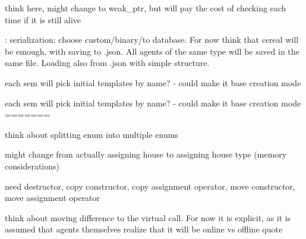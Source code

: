 \begin{DoxyRefList}
\item[\label{_dev_stage2__DevStage2000030}%
\hypertarget{_dev_stage2__DevStage2000030}{}%
Member \hyperlink{classsolar__core_1_1_w_a1d35d6501eef6d673bd2b28e2c1724c4}{solar\+\_\+core\+:\+:W\+:\+:interconnected\+\_\+projects} ]think here, might change to weak\+\_\+ptr, but will pay the cost of checking each time if it is still alive  
\item[\label{_dev_stage2__DevStage2000029}%
\hypertarget{_dev_stage2__DevStage2000029}{}%
Member \hyperlink{classsolar__core_1_1_w_a969ad4de57020878a91873868c9bdb45}{solar\+\_\+core\+:\+:W\+:\+:W} (std\+::string path\+\_\+, \hyperlink{classsolar__core_1_1_helper_w}{Helper\+W} $\ast$w\+\_\+, std\+::string mode\+\_\+=\char`\"{}\+N\+E\+W\char`\"{})]\+: serialization\+: choose custom/binary/to database. For now think that cereal will be emough, with saving to .json. All agents of the same type will be saved in the same file. Loading also from .json with simple structure.

each sem will pick initial templates by name? -\/ could make it base creation mode 

each sem will pick initial templates by name? -\/ could make it base creation mode 
=======
\item[\label{_dev_stage2__DevStage2000012}%
\hypertarget{_dev_stage2__DevStage2000012}{}%
Member \hyperlink{namespacesolar__core_aa1147341e5ef7a40d68d1bd68e149362}{solar\+\_\+core\+:\+:E\+Param\+Types} ]think about splitting enum into multiple enums 
\item[\label{_dev_stage2__DevStage2000004}%
\hypertarget{_dev_stage2__DevStage2000004}{}%
Class \hyperlink{classsolar__core_1_1_household}{solar\+\_\+core\+:\+:Household} ]might change from actually assigning house to assigning house type (memory considerations) 
\item[\label{_dev_stage2__DevStage2000005}%
\hypertarget{_dev_stage2__DevStage2000005}{}%
Member \hyperlink{classsolar__core_1_1_household_a165b7c64c72e5ed4ea08307e32082517}{solar\+\_\+core\+:\+:Household\+:\+:ac\+\_\+inf\+\_\+quoting\+\_\+sei} ()]need destructor, copy constructor, copy assignment operator, move constructor, move assignment operator

think about moving difference to the virtual call. For now it is explicit, as it is assumed that agents themselves realize that it will be online vs offline quote 


\end{DoxyRefList}
